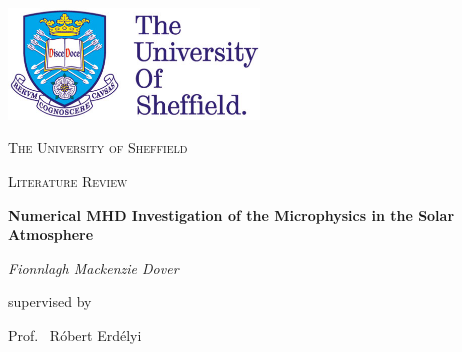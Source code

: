 \documentclass[12pt,a4paper,twoside]{article}
\begin{document}
\begin{titlepage}
	\centering
	\includegraphics[width=0.5\textwidth]{logo_uni2.jpg}\par\vspace{1cm}
	{\scshape\LARGE The University of Sheffield \par}
	\vspace{1cm}
	{\scshape\Large Literature Review\par}
	\vspace{1.5cm}
	{\Large\bfseries Numerical MHD Investigation of the Microphysics in the Solar Atmosphere\par}
	\vspace{2cm}
	{\Large\itshape Fionnlagh Mackenzie Dover\par}
	\vfill
	\large supervised by\par
	\Large Prof.~ R\'{o}bert Erd\'{e}lyi

	\vfill

\end{titlepage}
\setcounter{page}{0}
\end{document}
